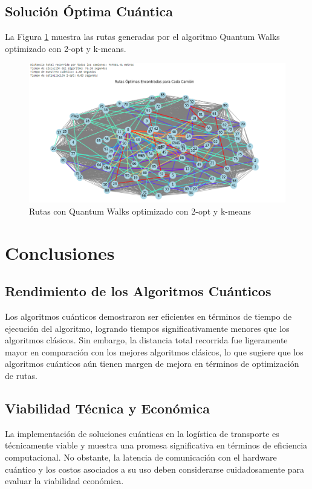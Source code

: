\documentclass[11pt,a4paper,spanish]{book}
\begin{document}
\subsection{Solución Óptima Cuántica}

La Figura \ref{fig:solucionQW2opt} muestra las rutas generadas por el algoritmo Quantum Walks optimizado con 2-opt y k-means.

\begin{figure}[H]
\centering
\includegraphics[width=1.1\linewidth]{solucionQW2opt.png}
\caption{Rutas con Quantum Walks optimizado con 2-opt y k-means}
\label{fig:solucionQW2opt}
\end{figure}

\section{Conclusiones}

\subsection{Rendimiento de los Algoritmos Cuánticos}

Los algoritmos cuánticos demostraron ser eficientes en términos de tiempo de ejecución del algoritmo, logrando tiempos significativamente menores que los algoritmos clásicos. Sin embargo, la distancia total recorrida fue ligeramente mayor en comparación con los mejores algoritmos clásicos, lo que sugiere que los algoritmos cuánticos aún tienen margen de mejora en términos de optimización de rutas.

\subsection{Viabilidad Técnica y Económica}

La implementación de soluciones cuánticas en la logística de transporte es técnicamente viable y muestra una promesa significativa en términos de eficiencia computacional. No obstante, la latencia de comunicación con el hardware cuántico y los costos asociados a su uso deben considerarse cuidadosamente para evaluar la viabilidad económica.
\end{document}
